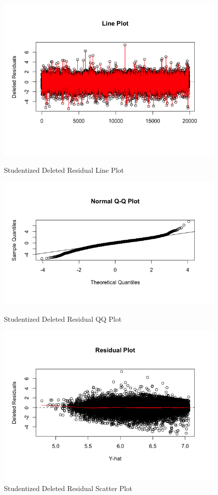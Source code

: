 \documentclass{article}
\begin{document}
\begin{figure}[H]
\begin{minipage}{.45\textwidth}
          \includegraphics[scale=0.35]{selection/linem1}
          \caption{Studentized Deleted Residual Line Plot}
          \label{fig:linem1}
        \end{minipage}
        \begin{minipage}{.45\textwidth}
          \centering
          \includegraphics[scale=0.35]{selection/qqm1}
          \caption{Studentized Deleted Residual QQ Plot}
          \label{fig:qqm1}

          \includegraphics[scale=0.35]{selection/scatterm1}
          \caption{Studentized Deleted Residual Scatter Plot}
          \label{fig:scatterm1}
        \end{minipage}
      \end{figure}
\end{document}
